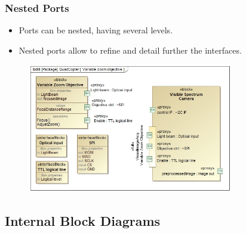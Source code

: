 \documentclass[xcolor=dvipsnames,t]{beamer}
\begin{document}
\begin{frame}
\frametitle{Nested Ports}



\begin{itemize}
\item Ports can be nested, having several levels.
\item Nested ports allow to refine and detail further the interfaces.
\end{itemize}

\begin{figure}
 	\includegraphics[width=0.8\textwidth]{PortsNested.jpg}
\end{figure}

\end{frame}

\subsection{Internal Block Diagrams}
\end{document}
